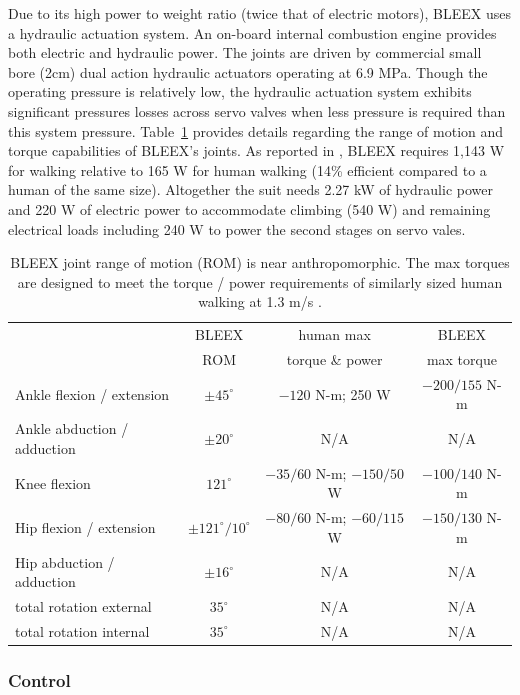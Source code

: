 Due to its high power to weight ratio (twice that of electric motors), BLEEX uses a hydraulic actuation system.  An on-board internal combustion engine provides both electric and hydraulic power.  The joints are driven by commercial small bore (2cm) dual action hydraulic actuators operating at 6.9 MPa. Though the operating pressure is relatively low, the hydraulic actuation system exhibits significant pressures losses across servo valves when less pressure is required than this system pressure.  Table~\ref{tab:bleex_joints} provides details regarding the range of motion and torque capabilities of BLEEX's joints.  As reported in \cite{bleex_design_2006}, BLEEX requires 1,143 W for walking relative to 165 W for human walking (14\% efficient compared to a human of the same size).  Altogether the suit needs 2.27 kW of hydraulic power and 220 W of electric power to accommodate climbing (540 W) and remaining electrical loads including 240 W to power the second stages on servo vales.

%
\begin{table}
\centering
\begin{tabular}{|l|*{3}{c|}}  %
\hline
& BLEEX & human max & BLEEX \\
& ROM & torque \& power & max torque \\ \hline
Ankle flexion / extension & $\pm 45^\circ$ & $-120$ N-m; 250 W & $-200 / 155$ N-m\\ \hline
Ankle abduction / adduction & $\pm 20^\circ$ & N/A & N/A \\ \hline
Knee flexion & $121^\circ$ & $-35 / 60$ N-m; $-150 / 50$ W & $-100 / 140$ N-m \\ \hline
Hip flexion / extension & $\pm 121^\circ / 10^\circ$ & $-80 / 60$ N-m; $-60 / 115$ W & $-150 / 130$ N-m \\ \hline
Hip abduction / adduction & $\pm 16^\circ$ & N/A & N/A\\ \hline
total rotation external & $35^\circ$ & N/A & N/A \\ \hline
total rotation internal & $35^\circ$ & N/A & N/A \\ \hline
\end{tabular}
\caption{BLEEX joint range of motion (ROM) is near anthropomorphic.  The max torques are designed to meet the torque / power requirements of similarly sized human walking at 1.3 m/s \cite{bleex_design_2006}.}\label{tab:bleex_joints}
\end{table}
%

\subsubsection{Control}


